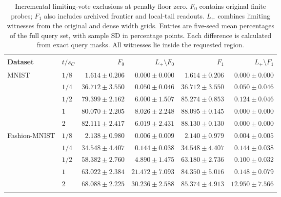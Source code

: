 \begin{table}[!htbp]
\centering\small
\caption{Incremental limiting-vote exclusions at penalty floor zero. $F_0$ contains original finite probes; $F_1$ also includes archived frontier and local-tail readouts. $L_+$ combines limiting witnesses from the original and dense width grids. Entries are five-seed mean percentages of the full query set, with sample SD in percentage points. Each difference is calculated from exact query masks. All witnesses lie inside the requested region.}
\label{tab:r3-overlap}
\begin{tabular}{@{}llrrrr@{}}
\toprule
Dataset & $t/s_C$ & $F_0$ & $L_+\setminus F_0$ & $F_1$ & $L_+\setminus F_1$\\
\midrule
MNIST & $1/8$ & $1.614\pm0.206$ & $0.000\pm0.000$ & $1.614\pm0.206$ & $0.000\pm0.000$\\
 & $1/4$ & $36.712\pm3.550$ & $0.050\pm0.046$ & $36.712\pm3.550$ & $0.050\pm0.046$\\
 & $1/2$ & $79.399\pm2.162$ & $6.000\pm1.507$ & $85.274\pm0.853$ & $0.124\pm0.046$\\
 & $1$ & $80.070\pm2.205$ & $8.026\pm2.248$ & $88.095\pm0.145$ & $0.000\pm0.000$\\
 & $2$ & $82.111\pm2.417$ & $6.019\pm2.431$ & $88.130\pm0.130$ & $0.000\pm0.000$\\
\addlinespace
Fashion-MNIST & $1/8$ & $2.138\pm0.980$ & $0.006\pm0.009$ & $2.140\pm0.979$ & $0.004\pm0.005$\\
 & $1/4$ & $34.548\pm4.407$ & $0.144\pm0.038$ & $34.548\pm4.407$ & $0.144\pm0.038$\\
 & $1/2$ & $58.382\pm2.760$ & $4.890\pm1.475$ & $63.180\pm2.736$ & $0.100\pm0.032$\\
 & $1$ & $63.022\pm2.384$ & $21.472\pm7.093$ & $84.350\pm5.016$ & $0.148\pm0.079$\\
 & $2$ & $68.088\pm2.225$ & $30.236\pm2.588$ & $85.374\pm4.913$ & $12.950\pm7.566$\\
\addlinespace
\bottomrule
\end{tabular}
\end{table}
